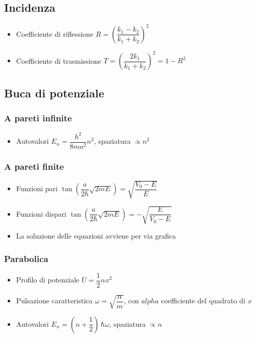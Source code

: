 \documentclass{article}
\begin{document}
\subsection{Incidenza}
\begin{itemize}
  \item Coefficiente di riflessione \( R = \left( \dfrac{k_1 - k_2}{k_1 + k_2} \right) ^ 2 \)
  \item Coefficiente di trasmissione \( T = \left( \dfrac{2 k_1}{k_1 + k_2} \right) ^ 2 = 1 - R ^ 2 \)
\end{itemize}

\subsection{Buca di potenziale}

\subsubsection{A pareti infinite}
\begin{itemize}
  \item Autovalori \( E_n = \dfrac{h^2}{8 m a ^2} n^2 \), spaziatura \( \propto n^2 \)
\end{itemize}

\subsubsection{A pareti finite}
\begin{itemize}
  \item Funzioni pari \( \tan\left( \dfrac{a}{2 \hbar} \sqrt{2mE} \right) = \sqrt{\dfrac{V_0 - E}{E}} \)
  \item Funzioni dispari \( \tan\left( \dfrac{a}{2 \hbar} \sqrt{2mE} \right) = - \sqrt{\dfrac{E}{V_0 - E}} \)
  \item La soluzione delle equazioni avviene per via grafica
\end{itemize}

\subsubsection{Parabolica}
\begin{itemize}
  \item Profilo di potenziale \( U = \dfrac{1}{2} \alpha x ^ 2 \)
  \item Pulsazione caratteristica \( \omega = \sqrt{\dfrac{\alpha}{m}} \), con \( alpha \) coefficiente del quadrato di \( x \)
  \item Autovalori \( E_n = \left( n + \dfrac{1}{2} \right) \, \hbar \omega \),  spaziatura \( \propto n \)
\end{itemize}
\end{document}
